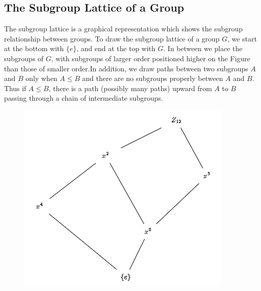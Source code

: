 \subsection{The Subgroup Lattice of a Group}

The subgroup lattice is a graphical representation which shows the subgroup relationship between groups. To draw the subgroup lattice of a group $G$, we start at the bottom with $\{e\}$, and end at the top with $G$. In between we place the subgroups of $G$, with subgroups of larger order positioned higher on the Figure than those of smaller order.In addition, we draw paths between two subgroups $A$ and $B$ only when $A \leq B$ and there are no subgroups properly between $A$ and $B$. Thus if $A \leq B$, there is a path (possibly many paths) upward from $A$ to $B$ passing through a chain of intermediate subgroups.


\begin{figure}[H]
\centering
\includegraphics[scale=0.55]{images/2023-07-11_Z12_lattice.png}
\end{figure}





